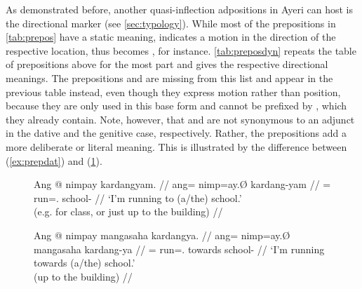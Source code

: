 \label{manga}
As demonstrated before, another quasi-inflection adpositions in Ayeri can host
is the directional marker  (see \autoref{sec:typology}). While
most of the prepositions in \autoref{tab:prepos} have a static meaning,
 indicates a motion in the direction of the respective
location, thus  becomes , for instance. \autoref{tab:preposdyn} repeats the table of
prepositions above for the most part and gives the respective directional
meanings. The prepositions  and 
are missing from this list and appear in the previous table instead, even
though they express motion rather than position, because they are only used in
this base form and cannot be prefixed by , which they already
contain. Note, however, that  and 
are not synonymous to an adjunct in the dative and the genitive case,
respectively. Rather, the prepositions add a more deliberate or literal
meaning. This is illustrated by the difference between (\ref{ex:prepdat}) and
(\ref{ex:prepmgsh}).

\begin{figure}[h]
\pex
\a\label{ex:prepdat}\begingl
	\gla Ang @ nimpay kardangyam. //
	\glb ang= nimp=ay.Ø kardang-yam //
	\glc \AgtT{}= run=\Fsg{}.\Top{} school-\Dat{} //
	\glft `I'm running to (a/the) school.' \\
		(e.g. for class, or just up to the building) //
\endgl

\a\label{ex:prepmgsh}\begingl
	\gla Ang @ nimpay mangasaha kardangya. //
	\glb ang= nimp=ay.Ø mangasaha kardang-ya //
	\glc \AgtT{}= run=\Fsg{}.\Top{} towards school-\Loc{} //
	\glft `I'm running towards (a/the) school.' \\
		(up to the building) //
\endgl
\xe
\end{figure}



